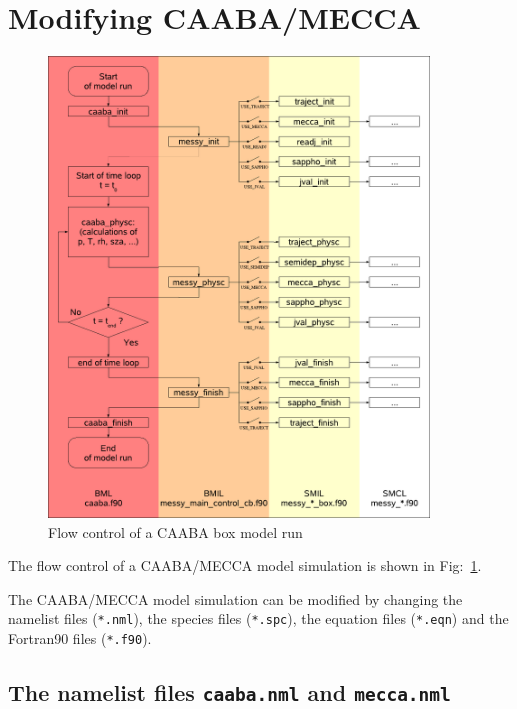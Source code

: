 \documentclass[twoside]{article}
\begin{document}
\section{Modifying CAABA/MECCA}
\label{sec:modifying}

\begin{figure}[htb]
  \begin{center}
  \includegraphics[width=0.9\textwidth]{caaba_flowcontrol}
  \end{center}
  \caption{Flow control of a CAABA box model run}
  \label{fig:caaba_flowcontrol}
\end{figure}

The flow control of a CAABA/MECCA model simulation is shown in
Fig:~\ref{fig:caaba_flowcontrol}.

The CAABA/MECCA model simulation can be modified by changing the
namelist files (\verb|*.nml|), the species files (\verb|*.spc|), the
equation files (\verb|*.eqn|) and the Fortran90 files (\verb|*.f90|).

\subsection{The namelist files {\tt caaba.nml} and {\tt mecca.nml}}
\label{sec:nmlfiles}
\end{document}
